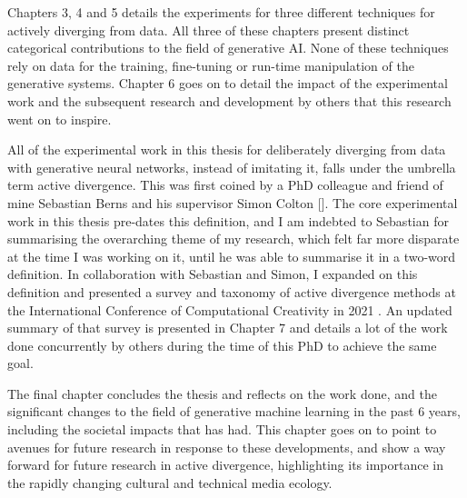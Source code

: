 Chapters 3, 4 and 5 details the experiments for three different techniques for actively diverging from data. 
All three of these chapters present distinct categorical contributions to the field of generative AI. 
None of these techniques rely on data for the training, fine-tuning or run-time manipulation of the generative systems. 
Chapter 6 goes on to detail the impact of the experimental work and the subsequent research and development by others that this research went on to inspire. 

All of the experimental work in this thesis for deliberately diverging from data with generative neural networks, instead of imitating it, falls under the umbrella term active divergence. 
This was first coined by a PhD colleague and friend of mine Sebastian Berns and his supervisor Simon Colton [\citeyear{berns2020bridging}]. 
The core experimental work in this thesis pre-dates this definition, and I am indebted to Sebastian for summarising the overarching theme of my research, which felt far more disparate at the time I was working on it, until he was able to summarise it in a two-word definition. 
In collaboration with Sebastian and Simon, I expanded on this definition and presented a survey and taxonomy of active divergence methods at the International Conference of Computational Creativity in 2021 \citep{broad2021active}.
An updated summary of that survey is presented in Chapter 7 and details a lot of the work done concurrently by others during the time of this PhD to achieve the same goal.

The final chapter concludes the thesis and reflects on the work done, and the significant changes to the field of generative machine learning in the past 6 years, including the societal impacts that has had. 
This chapter goes on to point to avenues for future research in response to these developments, and show a way forward for future research in active divergence, highlighting its importance in the rapidly changing cultural and technical media ecology.  


